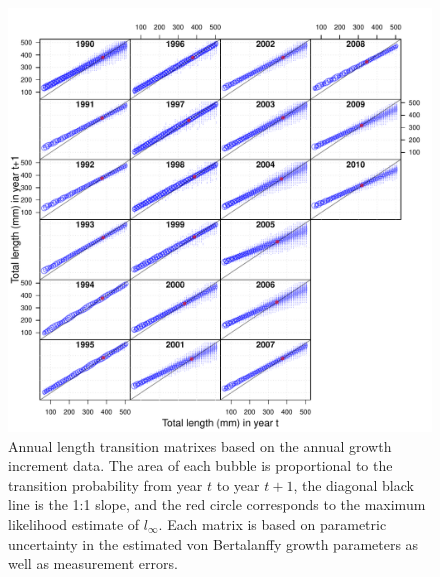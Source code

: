 \begin{figure}[htbp]
	\centering
		\includegraphics[width=6.5in]{../FIGS/LSMR/fig:TransitionMatrix.pdf}
	\caption{Annual length transition matrixes based on the annual growth increment data.  The area of each bubble is proportional to the transition probability from year $t$ to year $t+1$, the diagonal black line is the 1:1 slope, and the red circle corresponds to the maximum likelihood estimate of $l_\infty$.  Each matrix is based on parametric uncertainty in the estimated von Bertalanffy growth parameters as well as measurement errors. }
	\label{fig:FIGS_LSMR_fig:TransitionMatrix}
\end{figure}


